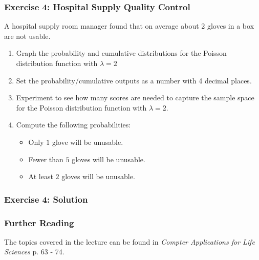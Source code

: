 \documentclass[12pt]{beamer}
\begin{document}
	\begin{frame}
		\frametitle{Exercise 4: Hospital Supply Quality Control}
		A hospital supply room manager found that on average about 2 gloves in a box are not usable.
		 
		\begin{enumerate}
			\item Graph the probability and cumulative distributions for the Poisson distribution function with $\lambda = 2$ 
			\item Set the probability/cumulative outputs as a number with 4 decimal places.
			\item Experiment to see how many scores are needed to capture the sample space for the Poisson distribution function with $\lambda=2$. 
			\item Compute the following probabilities:
				\begin{itemize}
					\item Only $1$ glove will be unusable.
					\item Fewer than $5$ gloves will be unusable.
					\item At least $2$ gloves will be unusable.
				\end{itemize}
		\end{enumerate}
	\end{frame}
	\begin{frame}
		\frametitle{Exercise 4: Solution}
	\end{frame}
	\begin{frame}
		\frametitle{Further Reading}
		The topics covered in the lecture can be found in \textit{Compter Applications for Life Sciences} p. 63 - 74.
	\end{frame}
\end{document}

